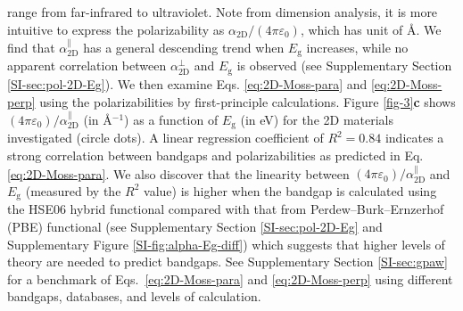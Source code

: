 \documentclass[journal=ancac3,manuscript=article,email=true,hyperref=true,keywords=false]{achemso}
\begin{document}
range from far-infrared to ultraviolet.  Note from dimension analysis,
it is more intuitive to express the polarizability as
$\alpha_{\mathrm{2D}}/(4 \pi \varepsilon_{0})$, which has unit of
\AA. We find that $\alpha_{\mathrm{2D}}^{\parallel}$ has a general
descending trend when $E_{\mathrm{g}}$ increases, while no apparent
correlation between $\alpha_{\mathrm{2D}}^{\perp}$ and
$E_{\mathrm{g}}$ is observed (see Supplementary Section
\ref{SI-sec:pol-2D-Eg}).  We then examine Eqs. \ref{eq:2D-Moss-para}
and \ref{eq:2D-Moss-perp} using the polarizabilities by
first-principle calculations.  Figure \ref{fig-3}{\textbf c} shows
$(4 \pi \varepsilon_{0})/\alpha_{\mathrm{2D}}^{\parallel}$ (in
\AA{}$^{-1}$) as a function of $E_{\mathrm{g}}$ (in eV) for the 2D
materials investigated (circle dots).  A linear regression coefficient
of $R^{2}=0.84$ indicates a strong correlation between bandgaps and
polarizabilities as predicted in Eq. \ref{eq:2D-Moss-para}.  We also
discover that the linearity between
$(4 \pi \varepsilon_{0})/\alpha_{\mathrm{2D}}^{\parallel}$ and
$E_{\mathrm{g}}$ (measured by the $R^{2}$ value) is higher when the
bandgap is calculated using the HSE06 hybrid
functional\cite{Heyd_2005} compared with that from
Perdew--Burk--Ernzerhof (PBE)
functional%
(see Supplementary Section \ref{SI-sec:pol-2D-Eg} and Supplementary
Figure \ref{SI-fig:alpha-Eg-diff}) which suggests that higher levels
of theory are needed to predict bandgaps. See Supplementary Section
\ref{SI-sec:gpaw} for a benchmark of Eqs.~\ref{eq:2D-Moss-para} and
\ref{eq:2D-Moss-perp} using different bandgaps, databases, and levels
of calculation.
\end{document}
